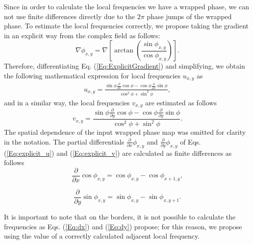 Since in order to calculate the local frequencies we have a wrapped phase, we
can not use finite differences directly due to the $2\pi$ phase jumps of the
wrapped phase. To estimate the local frequencies correctly, we propose taking
the gradient in an explicit way from the complex field as follows:
\begin{equation}\label{Eq:ExplicitGradient}
  \nabla \phi_{x,y} = \nabla \left[ \arctan \left(\frac{\sin{\phi_{x,y}}}	
      {\cos{\phi_{x,y}}}\right)\right].
\end{equation}
Therefore, differentiating Eq. (\ref{Eq:ExplicitGradient}) and 
simplifying, we obtain the following mathematical expression for local 
frequencies $u_{x,y}$ as
\begin{eqnarray}\label{Eq:explicit_u}
  u_{x,y} = \frac{\sin \phi \frac{\partial}{\partial x}  \cos \phi - \cos 
  \phi \frac{\partial}{\partial x} \sin \phi}{ \cos^2 \phi + \sin^2 \phi 
  },
\end{eqnarray}
and in a similar way, the local frequencies $v_{x,y}$ are estimated as
follows
\begin{equation}\label{Eq:explicit_v}
  v_{x,y} =\frac{\sin \phi \frac{\partial}{\partial y}  \cos \phi - \cos 
  \phi \frac{\partial}{\partial y} \sin \phi}{ \cos^2 \phi + \sin^2 \phi 
  }.
\end{equation}
The spatial dependence of the input wrapped phase map was omitted for clarity
in the notation. The partial differentials $\frac{\partial}{\partial
  x} \phi_{x,y}$ and $\frac{\partial}{\partial y} \phi_{x,y}$ of
Eqs. (\ref{Eq:explicit_u}) and (\ref{Eq:explicit_v}) are calculated as
finite differences as follows
\begin{equation}\label{Eq:dx}
  \frac{\partial}{\partial x} \cos\phi_{x,y} = 
  \cos\phi_{x,y}-\cos\phi_{x+1,y},
\end{equation}

\begin{equation}\label{Eq:dy}
  \frac{\partial}{\partial y} \sin\phi_{x,y} = 
  \sin\phi_{x,y}-\sin\phi_{x,y+1}.
\end{equation}

It is important to note that on the borders, it is not possible to
calculate the frequencies as Eqs. (\ref{Eq:dx}) and (\ref{Eq:dy}) propose; 
for this reason, we propose using the value of a correctly calculated 
adjacent local frequency.


